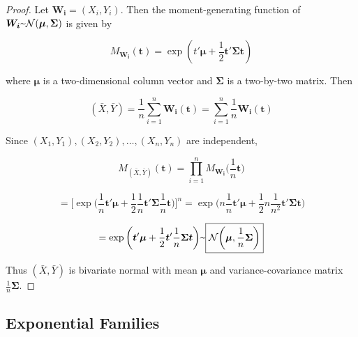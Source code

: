 \begin{proof}

Let \(\boldsymbol{W_i} = (X_i, Y_i)\). Then the moment-generating function of \(\boldsymbol{W_i} \textapprox \mathcal{N}(\boldsymbol{\mu}, \boldsymbol{\Sigma})\) is given by

\[
M_{\boldsymbol{W_i}}(\boldsymbol{t}) = \exp(t' \boldsymbol{\mu} + \frac{1}{2} \boldsymbol{t}' \boldsymbol{\Sigma} \boldsymbol{t})
\]

where \(\boldsymbol{\mu}\) is a two-dimensional column vector and \( \boldsymbol{\Sigma}\) is a two-by-two matrix. Then

\[
(\bar{X}, \bar{Y}) = \frac{1}{n} \sum_{i=1}^n \boldsymbol{W_i}(\boldsymbol{t}) =  \sum_{i=1}^n \frac{1}{n} \boldsymbol{W_i}(\boldsymbol{t})
\]

Since \((X_1, Y_1), (X_2, Y_2), \ldots ,(X_n, Y_n)\) are independent,

\[
M_{(\bar{X}, \bar{Y})}(\boldsymbol{t}) = \prod_{i=1}^n M_{\boldsymbol{W_i}}\bigg(\frac{1}{n} \boldsymbol{t} \bigg)
\]

\[
= \bigg[ \exp\bigg(\frac{1}{n} \boldsymbol{t}' \boldsymbol{\mu} + \frac{1}{2} \frac{1}{n} \boldsymbol{t}' \boldsymbol{\Sigma} \frac{1}{n}  \boldsymbol{t} \bigg) \bigg]^n =  \exp\bigg(n \frac{1}{n} \boldsymbol{t}' \boldsymbol{\mu} + \frac{1}{2} n \frac{1}{n^2} \boldsymbol{t}' \boldsymbol{\Sigma} \boldsymbol{t} \bigg) 
\]

\[
=  \exp\bigg( \boldsymbol{t}' \boldsymbol{\mu} + \frac{1}{2} \boldsymbol{t}' \frac{1}{n}  \boldsymbol{\Sigma} \boldsymbol{t} \bigg) \textapprox \boxed{\mathcal{N}\bigg(\boldsymbol{\mu}, \frac{1}{n}\boldsymbol{\Sigma}\bigg)}
\]

Thus \((\bar{X}, \bar{Y})\) is bivariate normal with mean \(\boldsymbol{\mu}\) and variance-covariance matrix \(\frac{1}{n}\boldsymbol{\Sigma}\).


\end{proof}

\subsection{Exponential Families}

